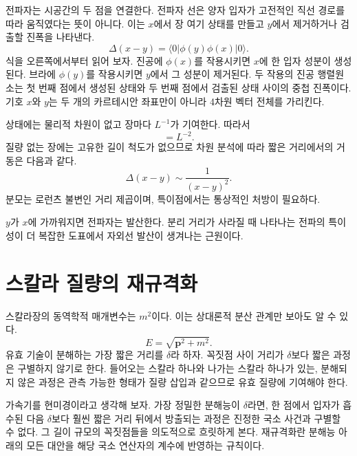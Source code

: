 전파자는 시공간의 두 점을 연결한다. 전파자 선은 양자 입자가 고전적인 직선 경로를 따라 움직였다는 뜻이 아니다. 이는 \(x\)에서 장 여기 상태를 만들고 \(y\)에서 제거하거나 검출할 진폭을 나타낸다.
\begin{equation}
\Delta(x-y)=\langle0|\phi(y)\phi(x)|0\rangle.
\label{eq:position-propagator}
\end{equation}
식을 오른쪽에서부터 읽어 보자. 진공에 \(\phi(x)\)를 작용시키면 \(x\)에 한 입자 성분이 생성된다. 브라에 \(\phi(y)\)를 작용시키면 \(y\)에서 그 성분이 제거된다. 두 작용의 진공 행렬원소는 첫 번째 점에서 생성된 상태와 두 번째 점에서 검출된 상태 사이의 중첩 진폭이다. 기호 \(x\)와 \(y\)는 두 개의 카르테시안 좌표만이 아니라 4차원 벡터 전체를 가리킨다.

상태에는 물리적 차원이 없고 장마다 \(L^{-1}\)가 기여한다. 따라서
\begin{equation}
[\Delta]=L^{-2}.
\end{equation}
질량 없는 장에는 고유한 길이 척도가 없으므로 차원 분석에 따라 짧은 거리에서의 거동은 다음과 같다.
\begin{equation}
\Delta(x-y)\sim\frac{1}{(x-y)^2}.
\label{eq:massless-propagator}
\end{equation}
분모는 로런츠 불변인 거리 제곱이며, 특이점에서는 통상적인 처방이 필요하다.

\(y\)가 \(x\)에 가까워지면 전파자는 발산한다. 분리 거리가 사라질 때 나타나는 전파의 특이성이 더 복잡한 도표에서 자외선 발산이 생겨나는 근원이다.

\section{스칼라 질량의 재규격화}

스칼라장의 동역학적 매개변수는 \(m^2\)이다. 이는 상대론적 분산 관계만 보아도 알 수 있다.
\begin{equation}
E=\sqrt{\mathbf p^2+m^2}.
\end{equation}
유효 기술이 분해하는 가장 짧은 거리를 \(\delta\)라 하자. 꼭짓점 사이 거리가 \(\delta\)보다 짧은 과정은 구별하지 않기로 한다. 들어오는 스칼라 하나와 나가는 스칼라 하나가 있는, 분해되지 않은 과정은 관측 가능한 형태가 질량 삽입과 같으므로 유효 질량에 기여해야 한다.

가속기를 현미경이라고 생각해 보자. 가장 정밀한 분해능이 \(\delta\)라면, 한 점에서 입자가 흡수된 다음 \(\delta\)보다 훨씬 짧은 거리 뒤에서 방출되는 과정은 진정한 국소 사건과 구별할 수 없다. 그 길이 규모의 꼭짓점들을 의도적으로 흐릿하게 본다. 재규격화란 분해능 아래의 모든 대안을 해당 국소 연산자의 계수에 반영하는 규칙이다.


